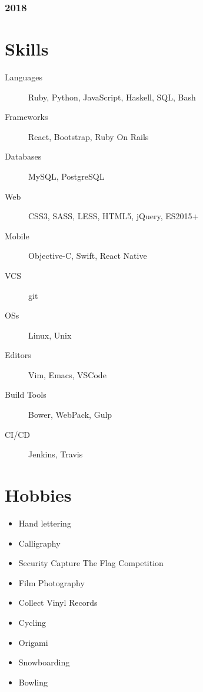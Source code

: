 \documentclass[letterpaper]{article}
\begin{document}
\subsubsection{2018}
\label{sec:orge8c8379}
\section{Skills}
\label{sec:orgfef80d9}
\begin{description}
\item[{Languages}] Ruby, Python, JavaScript, Haskell, SQL, Bash
\item[{Frameworks}] React, Bootstrap, Ruby On Rails
\item[{Databases}] MySQL, PostgreSQL
\item[{Web}] CSS3, SASS, LESS, HTML5, jQuery, ES2015+
\item[{Mobile}] Objective-C, Swift, React Native
\item[{VCS}] git
\item[{OSs}] Linux, Unix
\item[{Editors}] Vim, Emacs, VSCode
\item[{Build Tools}] Bower, WebPack, Gulp
\item[{CI/CD}] Jenkins, Travis
\end{description}
\section{Hobbies}
\label{sec:org567f689}
\begin{itemize}
\item Hand lettering
\item Calligraphy
\item Security Capture The Flag Competition
\item Film Photography
\item Collect Vinyl Records
\item Cycling
\item Origami
\item Snowboarding
\item Bowling
\end{itemize}
\end{document}
